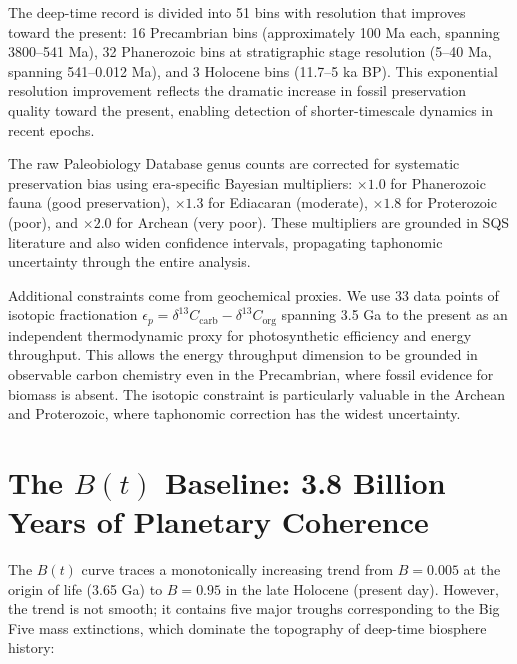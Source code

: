The deep-time record is divided into 51 bins with resolution that improves toward the present: 16 Precambrian bins (approximately 100 Ma each, spanning 3800--541 Ma), 32 Phanerozoic bins at stratigraphic stage resolution (5--40 Ma, spanning 541--0.012 Ma), and 3 Holocene bins (11.7--5 ka BP). This exponential resolution improvement reflects the dramatic increase in fossil preservation quality toward the present, enabling detection of shorter-timescale dynamics in recent epochs.

The raw Paleobiology Database genus counts are corrected for systematic preservation bias using era-specific Bayesian multipliers: $\times 1.0$ for Phanerozoic fauna (good preservation), $\times 1.3$ for Ediacaran (moderate), $\times 1.8$ for Proterozoic (poor), and $\times 2.0$ for Archean (very poor). These multipliers are grounded in SQS literature \cite{alroy2010} and also widen confidence intervals, propagating taphonomic uncertainty through the entire analysis.

Additional constraints come from geochemical proxies. We use 33 data points of isotopic fractionation $\epsilon_p = \delta^{13}C_\text{carb} - \delta^{13}C_\text{org}$ spanning 3.5 Ga to the present as an independent thermodynamic proxy for photosynthetic efficiency and energy throughput. This allows the energy throughput dimension to be grounded in observable carbon chemistry even in the Precambrian, where fossil evidence for biomass is absent. The isotopic constraint is particularly valuable in the Archean and Proterozoic, where taphonomic correction has the widest uncertainty.

\section{The $B(t)$ Baseline: 3.8 Billion Years of Planetary Coherence}

The $B(t)$ curve traces a monotonically increasing trend from $B = 0.005$ at the origin of life (3.65 Ga) to $B = 0.95$ in the late Holocene (present day). However, the trend is not smooth; it contains five major troughs corresponding to the Big Five mass extinctions, which dominate the topography of deep-time biosphere history:

